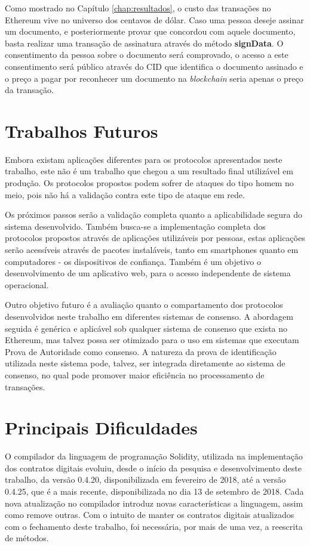 \documentclass[tcc,capa]{texufpel}
\begin{document}
            Como mostrado no Capítulo \ref{chap:resultados}, o custo das transações no Ethereum vive no universo dos centavos de dólar. Caso uma pessoa deseje assinar um documento, e posteriormente provar que concordou com aquele documento, basta realizar uma transação de assinatura através do método \textbf{signData}. O consentimento da pessoa sobre o documento será comprovado, o acesso a este consentimento será público através do CID que identifica o documento assinado e o preço a pagar por reconhecer um documento na \textit{blockchain} seria apenas o preço da transação.
        
    \section{Trabalhos Futuros}
    
        Embora existam aplicações diferentes para os protocolos apresentados neste trabalho, este não é um trabalho que chegou a um resultado final utilizável em produção. Os protocolos propostos podem sofrer de ataques do tipo homem no meio, pois não há a validação contra este tipo de ataque em rede.
        
        Os próximos passos serão a validação completa quanto a aplicabilidade segura do sistema desenvolvido. Também busca-se a implementação completa dos protocolos propostos através de aplicações utilizáveis por pessoas, estas aplicações serão acessíveis através de pacotes instaláveis, tanto em smartphones quanto em computadores - os dispositivos de confiança. Também é um objetivo o desenvolvimento de um aplicativo web, para o acesso independente de sistema operacional.
        
        Outro objetivo futuro é a avaliação quanto o compartamento dos protocolos desenvolvidos neste trabalho em diferentes sistemas de consenso. A abordagem seguida é genérica e aplicável sob qualquer sistema de consenso que exista no Ethereum, mas talvez possa ser otimizado para o uso em sistemas que executam Prova de Autoridade como consenso. A natureza da prova de identificação utilizada neste sistema pode, talvez, ser integrada diretamente ao sistema de consenso, no qual pode promover maior eficiência no processamento de transações.
        
    \section{Principais Dificuldades}
    
        O compilador da linguagem de programação Solidity, utilizada na implementação dos contratos digitais evoluiu, desde o início da pesquisa e desenvolvimento deste trabalho, da versão 0.4.20, disponibilizada em fevereiro de 2018, até a versão 0.4.25, que é a mais recente, disponibilizada no dia 13 de setembro de 2018. Cada nova atualização no compilador introduz novas características a linguagem, assim como remove outras. Com o intuito de manter os contratos digitais atualizados com o fechamento deste trabalho, foi necessária, por mais de uma vez, a reescrita de métodos.
    
\end{document}
